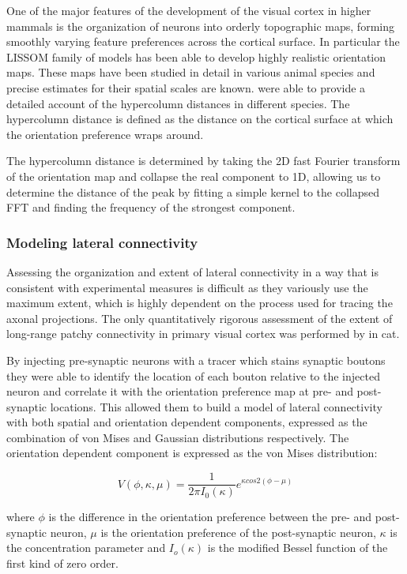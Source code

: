 One of the major features of the development of the visual cortex in
higher mammals is the organization of neurons into orderly topographic
maps, forming smoothly varying feature preferences across the cortical
surface. In particular the LISSOM family of models has been able to
develop highly realistic orientation maps. These maps have been
studied in detail in various animal species and precise estimates for
their spatial scales are known. \cite{Kaschube2010} were able to
provide a detailed account of the hypercolumn distances in different
species. The hypercolumn distance is defined as the distance on the
cortical surface at which the orientation preference wraps around.

The hypercolumn distance is determined by taking the 2D fast Fourier
transform of the orientation map and collapse the real component to
1D, allowing us to determine the distance of the peak by fitting a
simple kernel to the collapsed FFT and finding the frequency of the
strongest component.

\subsubsection{Modeling lateral connectivity} \label{BuzasEquations}

Assessing the organization and extent of lateral connectivity in a way
that is consistent with experimental measures is difficult as they
variously use the maximum extent, which is highly dependent on the
process used for tracing the axonal projections. The only quantitatively
rigorous assessment of the extent of long-range patchy connectivity in
primary visual cortex was performed by \cite{Buzas2006} in cat.

By injecting pre-synaptic neurons with a tracer which stains synaptic
boutons they were able to identify the location of each bouton
relative to the injected neuron and correlate it with the orientation
preference map at pre- and post-synaptic locations. This allowed them
to build a model of lateral connectivity with both spatial and
orientation dependent components, expressed as the combination of
von Mises and Gaussian distributions respectively. The orientation
dependent component is expressed as the von Mises distribution:

\begin{equation}
V(\phi, \kappa, \mu) = \frac{1}{2 \pi I_0(\kappa)} e^{\kappa cos 2(\phi - \mu)}
\end{equation}

where $\phi$ is the difference in the orientation preference between
the pre- and post-synaptic neuron, $\mu$ is the orientation preference
of the post-synaptic neuron, $\kappa$ is the concentration parameter
and $I_o(\kappa)$ is the modified Bessel function of the first kind of
zero order.


